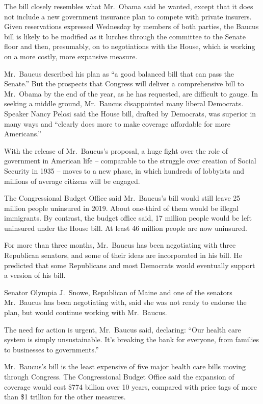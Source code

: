 ﻿\documentclass[12pt]{article}
\begin{document}
The bill closely resembles what Mr.~Obama said he wanted, except that it does not include a new
government insurance plan to compete with private insurers. Given reservations expressed Wednesday
by members of both parties, the Baucus bill is likely to be modified as it lurches through the
committee to the Senate floor and then, presumably, on to negotiations with the House, which is
working on a more costly, more expansive measure.

Mr.~Baucus described his plan as ``a good balanced bill that can pass the Senate.'' But the
prospects that Congress will deliver a comprehensive bill to Mr.~Obama by the end of the year, as he
has requested, are difficult to gauge. In seeking a middle ground, Mr.~Baucus disappointed many
liberal Democrats. Speaker Nancy Pelosi said the House bill, drafted by Democrats, was superior in
many ways and ``clearly does more to make coverage affordable for more Americans.''

With the release of Mr.~Baucus's proposal, a huge fight over the role of government in American life
-- comparable to the struggle over creation of Social Security in 1935 -- moves to a new phase, in
which hundreds of lobbyists and millions of average citizens will be engaged.

The Congressional Budget Office said Mr.~Baucus's bill would still leave 25 million people uninsured
in 2019. About one-third of them would be illegal immigrants. By contrast, the budget office said,
17 million people would be left uninsured under the House bill. At least 46 million people are now
uninsured.

For more than three months, Mr.~Baucus has been negotiating with three Republican senators, and some
of their ideas are incorporated in his bill. He predicted that some Republicans and most Democrats
would eventually support a version of his bill.

Senator Olympia J.~Snowe, Republican of Maine and one of the senators Mr.~Baucus has been
negotiating with, said she was not ready to endorse the plan, but would continue working with
Mr.~Baucus.

The need for action is urgent, Mr.~Baucus said, declaring: ``Our health care system is simply
unsustainable. It's breaking the bank for everyone, from families to businesses to governments.''

Mr.~Baucus's bill is the least expensive of five major health care bills moving through Congress.
The Congressional Budget Office said the expansion of coverage would cost \$774 billion over 10
years, compared with price tags of more than \$1 trillion for the other measures.
\end{document}
